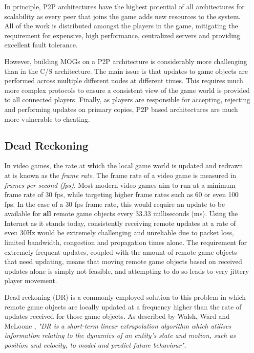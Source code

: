 In principle, P2P architectures have the highest potential of all architectures for scalability as every peer that joins the game adds new resources to the system. All of the work is distributed amongst the players in the game, mitigating the requirement for expensive, high performance, centralized servers and providing excellent fault tolerance. 

However, building MOGs on a P2P architecture is considerably more challenging than in the C/S architecture. The main issue is that updates to game objects are performed across multiple different nodes at different times. This requires much more complex protocols to ensure a consistent view of the game world is provided to all connected players. Finally, as players are responsible for accepting, rejecting and performing updates on primary copies, P2P based architectures are much more vulnerable to cheating. 

\subsection{Dead Reckoning}\label{sec:sota:dead-reckoning}
In video games, the rate at which the local game world is updated and redrawn at is known as the \textit{frame rate}. The frame rate of a video game is measured in \textit{frames per second (fps)}. Most modern video games aim to run at a minimum frame rate of 30 fps, while targeting higher frame rates such as 60 or even 100 fps. In the case of a 30 fps frame rate, this would require an update to be available for \textbf{all} remote game objects every 33.33 milliseconds (ms). Using the Internet as it stands today, consistently receiving remote updates at a rate of even 30Hz would be extremely challenging and unreliable due to packet loss, limited bandwidth, congestion and propagation times alone. The requirement for extremely frequent updates, coupled with the amount of remote game objects that need updating, means that moving remote game objects based on received updates alone is simply not feasible, and attempting to do so leads to very jittery player movement.

Dead reckoning (DR) is a commonly employed solution to this problem in which remote game objects are locally updated at a frequency higher than the rate of updates received for those game objects. As described by Walsh, Ward and McLoone \cite{dead-reckoning}, \textit{"DR is a short-term linear extrapolation algorithm which utilises information relating to the dynamics of an entity’s state and motion, such as position and velocity, to model and predict future behaviour"}.

